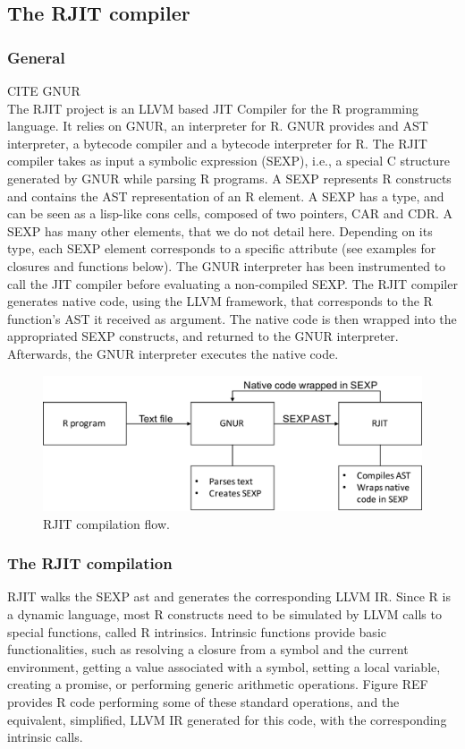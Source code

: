 \subsection{The RJIT compiler}
\subsubsection{General}
CITE GNUR\\
The RJIT project is an LLVM based JIT Compiler for the R programming language.
It relies on GNUR, an interpreter for R. 
GNUR provides and AST interpreter, a bytecode compiler and a bytecode interpreter for R.
The RJIT compiler takes as input a symbolic expression (SEXP), i.e., a special C structure generated by GNUR while parsing R programs.
A SEXP represents R constructs and contains the AST representation of an R element.
A SEXP has a type, and can be seen as a lisp-like cons cells, composed of two pointers, CAR and CDR.
A SEXP has many other elements, that we do not detail here.
Depending on its type, each SEXP element corresponds to a specific attribute (see examples for closures and functions below). 
The GNUR interpreter has been instrumented to call the JIT compiler before evaluating a non-compiled SEXP. 
The RJIT compiler generates native code, using the LLVM framework, that corresponds to the R function's AST it received as argument.
The native code is then wrapped into the appropriated SEXP constructs, and returned to the GNUR interpreter.
Afterwards, the GNUR interpreter executes the native code.\\ 

\begin{figure}[h]
    \includegraphics[scale=0.5]{Figures/RJITFlow}
    \caption{RJIT compilation flow.}
\end{figure}

\subsubsection{The RJIT compilation}
RJIT walks the SEXP ast and generates the corresponding LLVM IR.
Since R is a dynamic language, most R constructs need to be simulated by LLVM calls to special functions, called R intrinsics.
Intrinsic functions provide basic functionalities, such as resolving a closure from a symbol and the current environment, getting a value associated with a symbol, setting a local variable, creating a promise, or performing generic arithmetic operations.
Figure REF provides R code performing some of these standard operations, and the equivalent, simplified, LLVM IR generated for this code, with the corresponding intrinsic calls.\\

